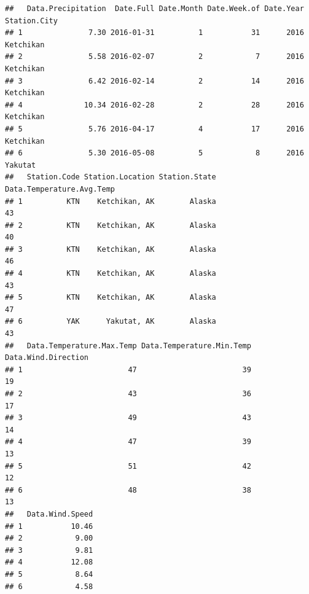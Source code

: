 \documentclass[
]{article}
\newenvironment{Shaded}{\begin{snugshade}}{\end{snugshade}}
\newcommand{\CommentTok}[1]{\textcolor[rgb]{0.56,0.35,0.01}{\textit{#1}}}
\newcommand{\DecValTok}[1]{\textcolor[rgb]{0.00,0.00,0.81}{#1}}
\newcommand{\KeywordTok}[1]{\textcolor[rgb]{0.13,0.29,0.53}{\textbf{#1}}}
\newcommand{\NormalTok}[1]{#1}
\newcommand{\OperatorTok}[1]{\textcolor[rgb]{0.81,0.36,0.00}{\textbf{#1}}}
\newcommand{\StringTok}[1]{\textcolor[rgb]{0.31,0.60,0.02}{#1}}
\begin{document}
\begin{Shaded}
\end{Shaded}

\begin{verbatim}
##   Data.Precipitation  Date.Full Date.Month Date.Week.of Date.Year Station.City
## 1               7.30 2016-01-31          1           31      2016    Ketchikan
## 2               5.58 2016-02-07          2            7      2016    Ketchikan
## 3               6.42 2016-02-14          2           14      2016    Ketchikan
## 4              10.34 2016-02-28          2           28      2016    Ketchikan
## 5               5.76 2016-04-17          4           17      2016    Ketchikan
## 6               5.30 2016-05-08          5            8      2016      Yakutat
##   Station.Code Station.Location Station.State Data.Temperature.Avg.Temp
## 1          KTN    Ketchikan, AK        Alaska                        43
## 2          KTN    Ketchikan, AK        Alaska                        40
## 3          KTN    Ketchikan, AK        Alaska                        46
## 4          KTN    Ketchikan, AK        Alaska                        43
## 5          KTN    Ketchikan, AK        Alaska                        47
## 6          YAK      Yakutat, AK        Alaska                        43
##   Data.Temperature.Max.Temp Data.Temperature.Min.Temp Data.Wind.Direction
## 1                        47                        39                  19
## 2                        43                        36                  17
## 3                        49                        43                  14
## 4                        47                        39                  13
## 5                        51                        42                  12
## 6                        48                        38                  13
##   Data.Wind.Speed
## 1           10.46
## 2            9.00
## 3            9.81
## 4           12.08
## 5            8.64
## 6            4.58
\end{verbatim}
\end{document}
